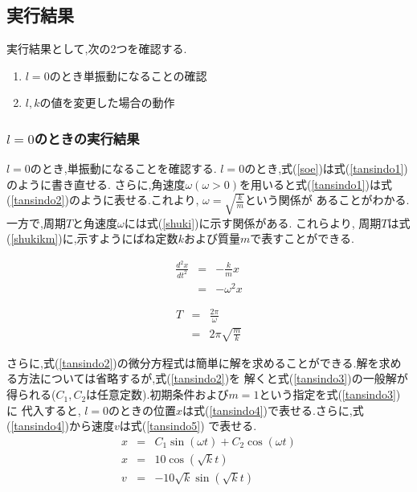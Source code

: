 \documentclass[a4j]{jarticle}
\begin{document}
      \subsection{実行結果}
      実行結果として,次の2つを確認する.
      \begin{enumerate}
        \item $l=0$のとき単振動になることの確認
        \item $l,k$の値を変更した場合の動作
      \end{enumerate}  

      \subsubsection{$l=0$のときの実行結果}
      $l=0$のとき,単振動になることを確認する. $l=0$のとき,式(\ref{soe})は式(\ref{tansindo1})のように書き直せる.
      さらに,角速度$\omega(\omega >0)$を用いると式(\ref{tansindo1})は式(\ref{tansindo2})のように表せる.これより, $\omega=\sqrt{\frac{k}{m}}$という関係が
      あることがわかる.一方で,周期$T$と角速度$\omega$には式(\ref{shuki})に示す関係がある. これらより,
      周期$T$は式(\ref{shukikm})に,示すようにばね定数$k$および質量$m$で表すことができる.

      \begin{eqnarray}
        \frac{d^2x}{dt^2} &=& -\frac{k}{m}x \label{tansindo1} \\
        &=& -\omega^2 x \label{tansindo2} 
      \end{eqnarray}

      \begin{eqnarray}
        T &=& \frac{2 \pi }{\omega} \label{shuki} \\
         &=& 2\pi \sqrt{\frac{m}{k}} \label{shukikm}
      \end{eqnarray}

      さらに,式(\ref{tansindo2})の微分方程式は簡単に解を求めることができる.解を求める方法については省略するが,式(\ref{tansindo2})を
      解くと式(\ref{tansindo3})の一般解が得られる($C_1,C_2$は任意定数).初期条件および$m=1$という指定を式(\ref{tansindo3})に
      代入すると, $l=0$のときの位置$x$は式(\ref{tansindo4})で表せる.さらに,式(\ref{tansindo4})から速度$v$は式(\ref{tansindo5})
      で表せる.
      \begin{eqnarray}
        x &=& C_1 \sin(\omega t) + C_2 \cos(\omega t) \label{tansindo3} \\
        x &=& 10\cos(\sqrt{k} t) \label{tansindo4} \\
        v &=& -10\sqrt{k} \sin(\sqrt{k} t) \label{tansindo5}
      \end{eqnarray}
\end{document}
